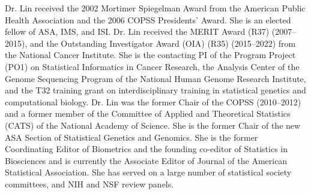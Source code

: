 Dr. Lin received the 2002 Mortimer Spiegelman Award from
the American Public Health Association and the 2006 COPSS Presidents'
Award. She is an elected fellow of ASA, IMS, and ISI. Dr. Lin received
the MERIT Award (R37) (2007--2015), and the Outstanding
Investigator Award (OIA) (R35) (2015--2022) from the National
Cancer Institute. She is the contacting PI of the Program Project
(PO1) on Statistical Informatics in Cancer Research, the Analysis
Center of the Genome Sequencing Program of the National Human Genome
Research Institute, and the T32 training grant on interdisciplinary
training in statistical genetics and computational biology. Dr. Lin
was the former Chair of the COPSS (2010--2012) and a former
member of the Committee of Applied and Theoretical Statistics (CATS)
of the National Academy of Science. She is the former Chair of the new
ASA Section of Statistical Genetics and Genomics. She is the former
Coordinating Editor of Biometrics and the founding co-editor of
Statistics in Biosciences and is currently the Associate Editor of
Journal of the American Statistical Association. She has served on a
large number of statistical society committees, and NIH and NSF review
panels. \\[2em]

\normalsize

